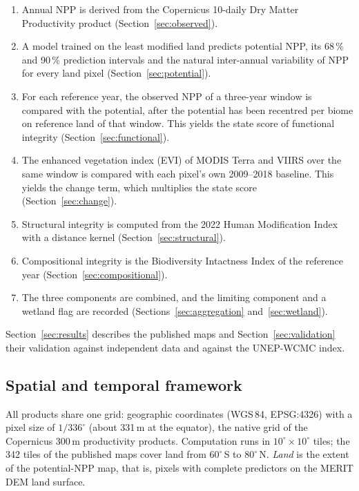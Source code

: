 \documentclass[11pt,a4paper]{article}
\begin{document}
\begin{enumerate}
\item Annual NPP is derived from the Copernicus 10-daily Dry Matter Productivity product
(Section~\ref{sec:observed}).
\item A model trained on the least modified land predicts potential NPP, its 68\,\% and 90\,\%
prediction intervals and the natural inter-annual variability of NPP for every land pixel
(Section~\ref{sec:potential}).
\item For each reference year, the observed NPP of a three-year window is compared with the
potential, after the potential has been recentred per biome on reference land of that window.
This yields the state score of functional integrity (Section~\ref{sec:functional}).
\item The enhanced vegetation index (EVI) of MODIS Terra and VIIRS over the same window is
compared with each pixel's own 2009--2018 baseline. This yields the change term, which multiplies
the state score (Section~\ref{sec:change}).
\item Structural integrity is computed from the 2022 Human Modification Index with a distance
kernel (Section~\ref{sec:structural}).
\item Compositional integrity is the Biodiversity Intactness Index of the reference year
(Section~\ref{sec:compositional}).
\item The three components are combined, and the limiting component and a wetland flag are
recorded (Sections~\ref{sec:aggregation} and~\ref{sec:wetland}).
\end{enumerate}
\noindent Section~\ref{sec:results} describes the published maps and
Section~\ref{sec:validation} their validation against independent data and against the
UNEP-WCMC index.

\subsection{Spatial and temporal framework}

All products share one grid: geographic coordinates (WGS\,84, EPSG:4326) with a pixel size of
$1/336^\circ$ (about 331\,m at the equator), the native grid of the Copernicus 300\,m
productivity products. Computation runs in $10^\circ \times 10^\circ$ tiles; the 342 tiles of
the published maps cover land from $60^\circ$\,S to $80^\circ$\,N. \emph{Land} is the
extent of the potential-NPP map, that is, pixels with complete predictors on the MERIT DEM land
surface.
\end{document}
